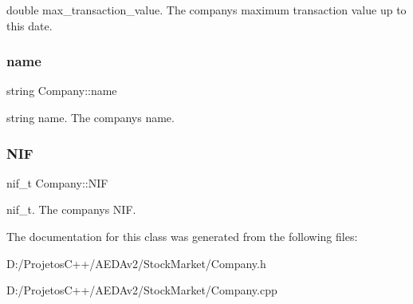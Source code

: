 double max\+\_\+transaction\+\_\+value. The company\textquotesingle{}s maximum transaction value up to this date. \mbox{\label{class_company_afe7bfcfc179e962e871f99ff69dbce74}} 
\subsubsection{\texorpdfstring{name}{name}}
{\footnotesize\ttfamily string Company\+::name\hspace{0.3cm}{\ttfamily [private]}}

string name. The company\textquotesingle{}s name. \mbox{\label{class_company_a0d65a4cc7270c8dcc77c61197d754bf8}} 
\subsubsection{\texorpdfstring{N\+IF}{NIF}}
{\footnotesize\ttfamily nif\+\_\+t Company\+::\+N\+IF\hspace{0.3cm}{\ttfamily [private]}}

nif\+\_\+t. The company\textquotesingle{}s N\+IF. 

The documentation for this class was generated from the following files\+:\begin{DoxyCompactItemize}
\item 
D\+:/\+Projetos\+C++/\+A\+E\+D\+Av2/\+Stock\+Market/Company.\+h\item 
D\+:/\+Projetos\+C++/\+A\+E\+D\+Av2/\+Stock\+Market/Company.\+cpp\end{DoxyCompactItemize}
